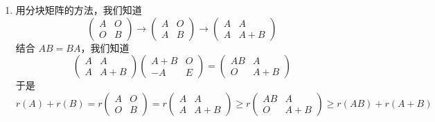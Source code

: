 \begin{exercise}
\begin{exgroup}
\begin{answer}
\begin{enumerate}
                \item 用分块矩阵的方法，我们知道
                      \[\begin{pmatrix}A & O \\ O & B\end{pmatrix}\rightarrow \begin{pmatrix}A & O \\ A & B\end{pmatrix}\rightarrow \begin{pmatrix}A & A \\ A & A+B\end{pmatrix}\]
                      结合 $AB=BA$，我们知道
                      \[\begin{pmatrix}A & A \\ A & A+B\end{pmatrix}\begin{pmatrix}A+B & O \\ -A & E\end{pmatrix}=\begin{pmatrix}AB & A \\ O & A+B\end{pmatrix}\]
                      于是
                      \[r(A)+r(B)=r\begin{pmatrix}A & O \\ O & B\end{pmatrix}=r\begin{pmatrix}A & A \\ A & A+B\end{pmatrix}\geqslant r\begin{pmatrix}AB & A \\ O & A+B\end{pmatrix}\geqslant r(AB)+r(A+B)\]
            \end{enumerate}
        \end{answer}


\end{exgroup}
\end{exercise}
